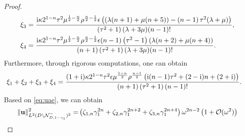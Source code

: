 \documentclass[11pt,reqno,twoside]{amsart}
\theoremstyle{definition}
\theoremstyle{remark}
\numberwithin{equation}{section}
\newcommand{\bu}{\mathbf{u}}
\newcommand{\bx}{\mathbf{x}}
\begin{document}
\begin{proof}
\begin{align}
		\xi _3&=\frac{\mathrm{i}\kappa 2^{1-n} \tau ^2 \mu ^{\frac{1}{2}-\frac{n}{2}} \rho ^{\frac{n}{2}-\frac{1}{2}}\epsilon \left( (\lambda  (n+1)+\mu  (n+5))-\left(n-1\right) \tau ^2 (\lambda +\mu )\right)}{ \left(\tau ^2+1\right) (\lambda +3 \mu ) (n-1)!},\notag\\
		\xi _4&=\frac{\mathrm{i} \kappa 2^{1-n} \tau ^2  \mu ^{\frac{1}{2}-\frac{n}{2}} \rho ^{\frac{n}{2}-\frac{1}{2}} \epsilon (n-1)\left(\tau ^2-1\right)(\lambda  (n+2)+\mu  (n+4))}{(n+1) \left(\tau ^2+1\right) (\lambda +3 \mu )  (n-1)!}.\notag
	\end{align}
	Furthermore, through rigorous computations, one can obtain
	\begin{align}
		\xi _1&+\xi _2+\xi _3+\xi _4=\frac{(1+\mathrm{i}) \kappa 2^{1-n} \tau ^2 \epsilon  \mu ^{\frac{1-n}{2}} \rho ^{\frac{n-1}{2}} \left(\mathrm{i} (n-1) \tau ^2+(2-\mathrm{i}) n+(2+\mathrm{i})\right)}{(n+1) \left(\tau ^2+1\right)  (n-1)!}.\notag
	\end{align}		
	Based on \eqref{eq:uae}, we can obtain 
	\begin{align}
		\|\bu\|_{L^2(D \setminus \mathcal{N}_{D,1-\gamma_{1}}^{-})^2}^2
		=&\left(\zeta _{1,n} \gamma_1 ^{2n}+\zeta _{2,n} \gamma_1 ^{2n+2}+\zeta _{3,n} \gamma_1 ^{2n+4}\right)\omega ^{2n-2}\left(1+\mathcal{O}(\omega^{2})\right)\notag\\

\end{align}
\end{proof}
\end{document}
